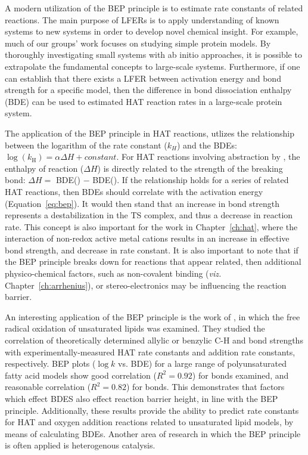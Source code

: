 A modern utilization of the BEP principle is to estimate rate constants of
related reactions. The main purpose of LFERs is to apply understanding of known
systems to new systems in order to develop novel chemical insight. For example,
much of our groups' work focuses on studying simple protein models. By
thoroughly investigating small systems with ab initio approaches, it is possible
to extrapolate the fundamental concepts to large-scale systems. Furthermore, if
one can establish that there exists a LFER between activation energy and bond
strength for a specific model, then the difference in bond dissociation enthalpy
(BDE) can be used to estimated HAT reaction rates in a large-scale protein
system.

The application of the BEP principle in HAT reactions, utlizes the relationship
between the logarithm of the rate constant ($k_H$) and the BDEs:
$\log(k_\mathrm{H}) = \alpha \Delta H + constant$. For HAT reactions involving
abstraction by \cumo, the enthalpy of reaction ($\Delta H$) is directly related
to the strength of the breaking bond: $\Delta H =$ BDE() $-$
BDE(). If the relationship holds for a series of related HAT
reactions, then BDEs should correlate with the activation energy
(Equation~\ref{eq:bep}). It would then stand that an increase in bond strength
represents a destabilization in the TS complex, and thus a decrease in reaction
rate. This concept is also important for the work in Chapter~\ref{ch:hat}, where
the interaction of non-redox active metal cations results in an increase in
effective bond strength, and decrease in rate constant. It is also important to
note that if the BEP principle breaks down for reactions that appear related,
then additional physico-chemical factors, such as non-covalent binding
(\emph{viz.} Chapter~\ref{ch:arrhenius}), or stereo-electronics may be
influencing the reaction barrier.

An interesting application of the BEP principle is the work of
\citet{Pratt2003}, in which the free radical oxidation of unsaturated lipids was
examined. They studied the correlation of theoretically determined allylic or
benzylic C-H and  bond strengths with experimentally-measured HAT
rate constants and  addition rate constants, respectively. BEP plots
($\log k$ vs. BDE) for a large range of polyunsaturated fatty acid models show
good correlation ($R^2 = 0.92$) for  bonds examined, and reasonable
correlation ($R^2 = 0.82$) for  bonds. This demonstrates that factors
which effect BDES also effect reaction barrier height, in line with the BEP
principle. Additionally, these results provide the ability to predict rate
constants for HAT and oxygen addition reactions related to unsaturated lipid
models, by means of calculating BDEs. Another area of research in which the BEP
principle is often applied is heterogenous catalysis.\cite{Panov2015}

